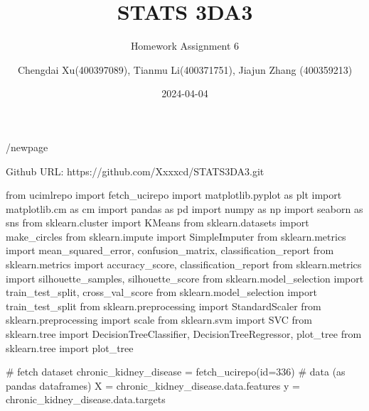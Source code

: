\documentclass[
  11pt,
  letterpaper,
  DIV=11,
  numbers=noendperiod]{scrartcl}
\title{STATS 3DA3}
\subtitle{Homework Assignment 6}
\author{Chengdai Xu(400397089), Tianmu Li(400371751), Jiajun Zhang
(400359213)}
\date{2024-04-04}
\newenvironment{Shaded}{\begin{snugshade}}{\end{snugshade}}
\newcommand{\BuiltInTok}[1]{\textcolor[rgb]{0.00,0.23,0.31}{#1}}
\newcommand{\CommentTok}[1]{\textcolor[rgb]{0.37,0.37,0.37}{#1}}
\newcommand{\DecValTok}[1]{\textcolor[rgb]{0.68,0.00,0.00}{#1}}
\newcommand{\ImportTok}[1]{\textcolor[rgb]{0.00,0.46,0.62}{#1}}
\newcommand{\NormalTok}[1]{\textcolor[rgb]{0.00,0.23,0.31}{#1}}
\newcommand{\OperatorTok}[1]{\textcolor[rgb]{0.37,0.37,0.37}{#1}}
\begin{document}
\maketitle

/newpage

Github URL: https://github.com/Xxxxcd/STATS3DA3.git

\begin{Shaded}
\begin{Highlighting}[]
\ImportTok{from}\NormalTok{ ucimlrepo }\ImportTok{import}\NormalTok{ fetch\_ucirepo }
\ImportTok{import}\NormalTok{ matplotlib.pyplot }\ImportTok{as}\NormalTok{ plt}
\ImportTok{import}\NormalTok{ matplotlib.cm }\ImportTok{as}\NormalTok{ cm}
\ImportTok{import}\NormalTok{ pandas }\ImportTok{as}\NormalTok{ pd}
\ImportTok{import}\NormalTok{ numpy }\ImportTok{as}\NormalTok{ np}
\ImportTok{import}\NormalTok{ seaborn }\ImportTok{as}\NormalTok{ sns}
\ImportTok{from}\NormalTok{ sklearn.cluster }\ImportTok{import}\NormalTok{ KMeans}
\ImportTok{from}\NormalTok{ sklearn.datasets }\ImportTok{import}\NormalTok{ make\_circles}
\ImportTok{from}\NormalTok{ sklearn.impute }\ImportTok{import}\NormalTok{ SimpleImputer}
\ImportTok{from}\NormalTok{ sklearn.metrics }\ImportTok{import}\NormalTok{ mean\_squared\_error, confusion\_matrix, classification\_report}
\ImportTok{from}\NormalTok{ sklearn.metrics }\ImportTok{import}\NormalTok{ accuracy\_score, classification\_report}
\ImportTok{from}\NormalTok{ sklearn.metrics }\ImportTok{import}\NormalTok{ silhouette\_samples, silhouette\_score}
\ImportTok{from}\NormalTok{ sklearn.model\_selection }\ImportTok{import}\NormalTok{ train\_test\_split, cross\_val\_score}
\ImportTok{from}\NormalTok{ sklearn.model\_selection }\ImportTok{import}\NormalTok{ train\_test\_split}
\ImportTok{from}\NormalTok{ sklearn.preprocessing }\ImportTok{import}\NormalTok{ StandardScaler}
\ImportTok{from}\NormalTok{ sklearn.preprocessing }\ImportTok{import}\NormalTok{ scale}
\ImportTok{from}\NormalTok{ sklearn.svm }\ImportTok{import}\NormalTok{ SVC}
\ImportTok{from}\NormalTok{ sklearn.tree }\ImportTok{import}\NormalTok{ DecisionTreeClassifier, DecisionTreeRegressor, plot\_tree}
\ImportTok{from}\NormalTok{ sklearn.tree }\ImportTok{import}\NormalTok{ plot\_tree}


\CommentTok{\# fetch dataset }
\NormalTok{chronic\_kidney\_disease }\OperatorTok{=}\NormalTok{ fetch\_ucirepo(}\BuiltInTok{id}\OperatorTok{=}\DecValTok{336}\NormalTok{) }
\CommentTok{\# data (as pandas dataframes) }
\NormalTok{X }\OperatorTok{=}\NormalTok{ chronic\_kidney\_disease.data.features }
\NormalTok{y }\OperatorTok{=}\NormalTok{ chronic\_kidney\_disease.data.targets }




\end{Highlighting}
\end{Shaded}
\end{document}
